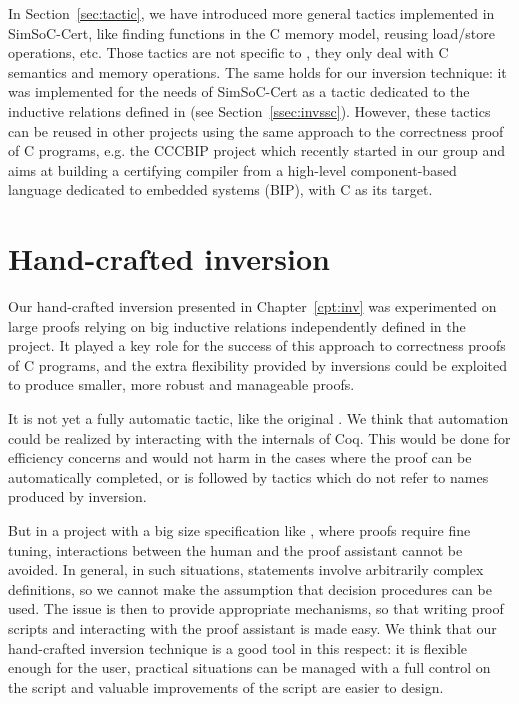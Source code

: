 In Section~\ref{sec:tactic}, we have introduced more general tactics
implemented in SimSoC-Cert, like finding functions in the C memory
model, reusing load/store operations, etc.  Those tactics are not
specific to \simlight, they only deal with \compcert C semantics and
memory operations.  The same holds for our inversion technique: it was
implemented for the needs of SimSoC-Cert as a tactic \hcinv dedicated
to the inductive relations defined in \compcert (see
Section~\ref{ssec:invssc}).  However, these tactics can be reused in
other projects using the same approach to the correctness proof of
\compcert C programs, e.g. the CCCBIP project
which recently started in our group and aims at building a certifying compiler
from a high-level component-based language dedicated to embedded systems
(BIP), with \compcert C as its target. 




\section{Hand-crafted inversion}

Our hand-crafted inversion presented in Chapter~\ref{cpt:inv}
was experimented on large proofs relying on big inductive relations
independently defined in the \compcert project.
It played a key role for the success of this approach to correctness proofs
of C programs, and
the extra flexibility provided by \hcinv inversions could be exploited to
produce smaller, more robust and manageable proofs.

It is not yet a fully automatic tactic, like the original \inversion. 
We think that
automation could be realized by interacting with the internals of Coq.
This would be done for efficiency concerns and would not harm
in the cases where the proof can be automatically completed,
or is followed by tactics which do not refer to names produced by inversion.

But in a project with a big size specification like \simsoccert,
where proofs require fine tuning,
interactions between the human and the proof assistant cannot be avoided.
In general, in such situations,
statements involve arbitrarily complex definitions,
so we cannot make the assumption that decision procedures can be used.
The issue is then to provide appropriate mechanisms,
so that writing proof scripts and interacting with the proof assistant
is made easy.
%
We think that our hand-crafted inversion technique is a good tool
in this respect:
it is flexible enough for the user,
practical situations can be managed
with a full control on the script and valuable improvements
of the script are easier to design.


